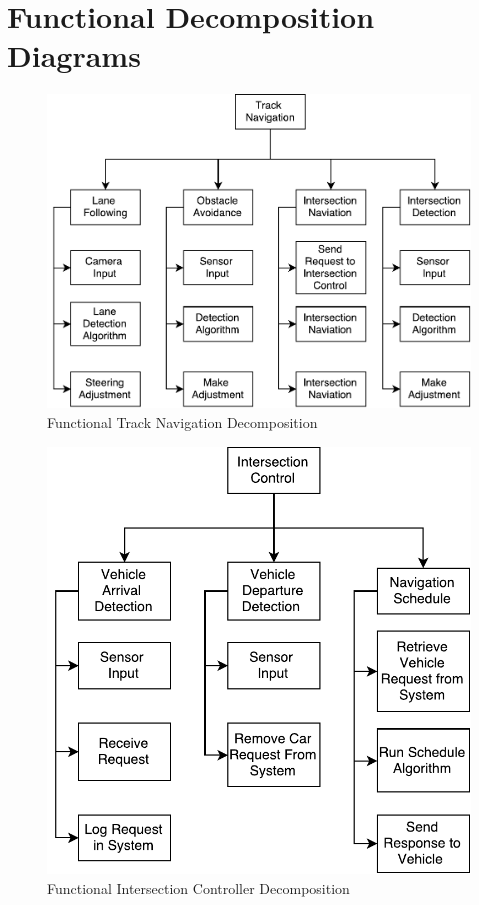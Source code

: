 \documentclass [11pt]{article}
\begin{document}
\section{Functional Decomposition Diagrams}
\begin{figure} [h!]
	
	\centering
	\includegraphics [scale =.9] {figures/function_decomp_track_n.pdf}
	\caption{Functional Track Navigation Decomposition}
\end{figure}
\break
\begin{figure} [h!]

	\centering
	\includegraphics [scale =.9] {figures/function_decomp_IC.pdf}
	\caption{Functional Intersection Controller Decomposition}
\end{figure}
\end{document}
